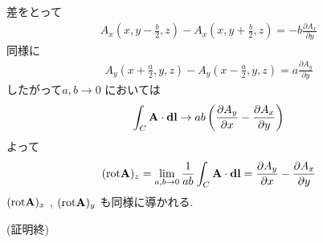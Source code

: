 \documentclass{jsarticle}
\begin{document}
差をとって
\begin{eqnarray}
A_x(x,y-\frac{b}{2},z)-A_x(x,y+\frac{b}{2},z) = -b \frac{\partial A_x}{\partial y}
\end{eqnarray}
同様に
\begin{eqnarray}
A_y(x+\frac{a}{2},y,z)-A_y(x-\frac{a}{2},y,z) = a \frac{\partial A_y}{\partial y}
\end{eqnarray}
したがって$a,b \to 0$ においては
\begin{eqnarray}
\int_{C}^{} {\bf A} \cdot {\bf dl} \to ab \left( \frac{\partial A_y}{\partial x} - \frac{\partial A_x}{\partial y} \right)
\end{eqnarray}
よって
\begin{eqnarray}
({\rm rot} {\bf A})_z = \lim_{a,b \to 0} \frac{1}{ab} \int_{C}^{} {\bf A} \cdot {\bf dl} =\frac{\partial A_y}{\partial x} - \frac{\partial A_x}{\partial y}
\end{eqnarray}
$({\rm rot} {\bf A})_x$ , $({\rm rot} {\bf A})_y$ も同様に導かれる.
\begin{flushright}
(証明終)
\end{flushright}
\end{document}
